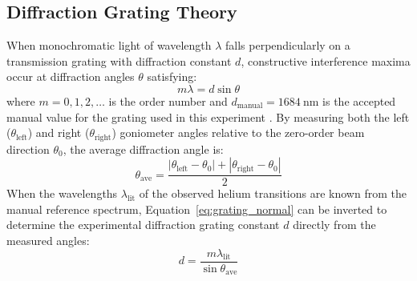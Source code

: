 \documentclass[journal]{IEEEtran}
\begin{document}
\subsection{Diffraction Grating Theory}
When monochromatic light of wavelength $\lambda$ falls perpendicularly on a transmission grating with diffraction constant $d$, constructive interference maxima occur at diffraction angles $\theta$ satisfying:
\begin{equation}
    m \lambda = d \sin\theta
    \label{eq:grating_normal}
\end{equation}
where $m = 0, 1, 2, \dots$ is the order number and $d_{\text{manual}} = \SI{1684}{\nano\meter}$ is the accepted manual value for the grating used in this experiment \cite{lab_manual}. By measuring both the left ($\theta_{\text{left}}$) and right ($\theta_{\text{right}}$) goniometer angles relative to the zero-order beam direction $\theta_0$, the average diffraction angle is:
\begin{equation}
    \theta_{\text{ave}} = \frac{|\theta_{\text{left}} - \theta_0| + |\theta_{\text{right}} - \theta_0|}{2}
    \label{eq:theta_ave}
\end{equation}
When the wavelengths $\lambda_{\text{lit}}$ of the observed helium transitions are known from the manual reference spectrum, Equation~\eqref{eq:grating_normal} can be inverted to determine the experimental diffraction grating constant $d$ directly from the measured angles:
\begin{equation}
    d = \frac{m \lambda_{\text{lit}}}{\sin\theta_{\text{ave}}}
    \label{eq:d_from_data}
\end{equation}

\end{document}
